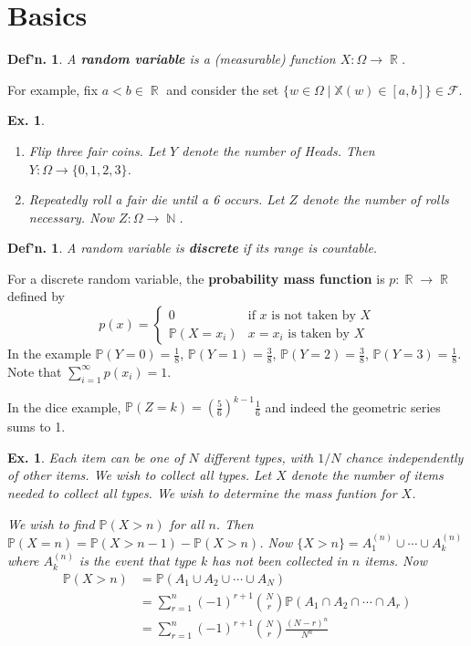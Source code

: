 \documentclass[12pt, a4paper]{book}
\DeclareMathOperator{\N}{\mathbb{N}}
\DeclareMathOperator{\R}{\mathbb{R}}
\renewcommand{\Pr}{\mathbb{P}}
\newtheorem{definition}[theorem]{Def'n.}
\newtheorem{example}[theorem]{Ex.}
\theoremstyle{nonumberplain}
\begin{document}
\section{Basics}
\begin{definition}
    A \textbf{random variable} is a (measurable) function $X:\Omega\to\R$.
\end{definition}
For example, fix $a<b\in\R$ and consider the set $\{w\in\Omega\mid\mathbb{X}(w)\in[a,b]\}\in\mathcal{F}$.
\begin{example}
    \begin{enumerate}
        \item Flip three fair coins.
            Let $Y$ denote the number of Heads.
            Then $Y:\Omega\to\{0,1,2,3\}$.
        \item Repeatedly roll a fair die until a 6 occurs.
            Let $Z$ denote the number of rolls necessary.
            Now $Z:\Omega\to\N$.
    \end{enumerate}
\end{example}
\begin{definition}
    A random variable is \textbf{discrete} if its range is countable.
\end{definition}
For a discrete random variable, the \textbf{probability mass function} is $p:\R\to\R$ defined by
\[p(x)=\begin{cases} 0&\text{if $x$ is not taken by $X$}\\\Pr(X=x_i)&\text{$x=x_i$ is taken by $X$}\end{cases}\]
In the example $\Pr(Y=0)=\frac{1}{8}$, $\Pr(Y=1)=\frac{3}{8}$, $\Pr(Y=2)=\frac{3}{8}$, $\Pr(Y=3)=\frac{1}{8}$.
Note that $\sum\limits_{i=1}^\infty p(x_i)=1$.

In the dice example, $\Pr(Z=k)=\left(\frac{5}{6}\right)^{k-1}\frac{1}{6}$ and indeed the geometric series sums to 1.
\begin{example}
    Each item can be one of $N$ different types, with $1/N$ chance independently of other items.
    We wish to collect all types.
    Let $X$ denote the number of items needed to collect all types.
    We wish to determine the mass funtion for $X$.

    We wish to find $\Pr(X>n)$ for all $n$.
    Then $\Pr(X=n)=\Pr(X>n-1)-\Pr(X>n)$.
    Now $\{X>n\}=A_1^{(n)}\cup\cdots\cup A_k^{(n)}$ where $A_k^{(n)}$ is the event that type $k$ has not been collected in $n$ items.
    Now
    \begin{align*}
        \Pr(X>n) &= \Pr(A_1\cup A_2\cup\cdots\cup A_N)\\
                 &= \sum\limits_{r=1}^n(-1)^{r+1}\binom{N}{r}\Pr(A_1\cap A_2\cap\cdots\cap A_r)\\
                 &= \sum\limits_{r=1}^n(-1)^{r+1}\binom{N}{r}\frac{(N-r)^n}{N^n}\\
    \end{align*}
\end{example}
\end{document}
